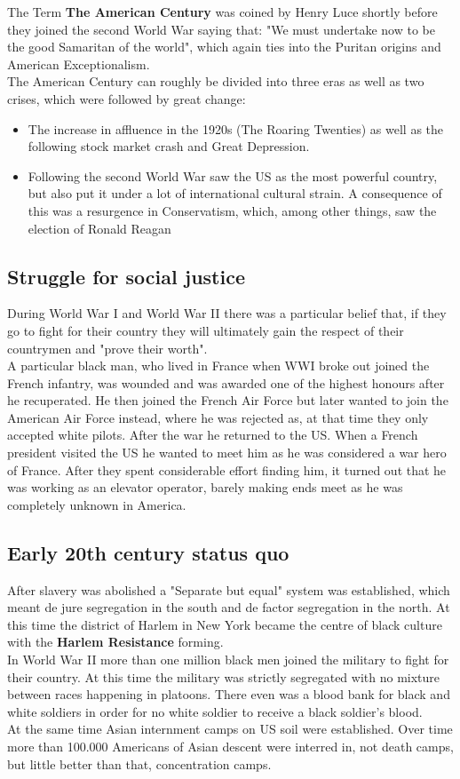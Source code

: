 \documentclass{article}
\begin{document}
	The Term \textbf{The American Century} was coined by Henry Luce shortly before they joined the second World War saying that: "We must undertake now to be the good Samaritan of the world", which again ties into the Puritan origins and American Exceptionalism. \\
	The American Century can roughly be divided into three eras as well as two crises, which were followed by great change:
	\begin{itemize}
		\item{The increase in affluence in the 1920s (The Roaring Twenties) as well as the following stock market crash and Great Depression.}
		\item{Following the second World War saw the US as the most powerful country, but also put it under a lot of international cultural strain. A consequence of this was a resurgence in Conservatism, which, among other things, saw the election of Ronald Reagan}
	\end{itemize}
	\subsection{Struggle for social justice}
	During World War I and World War II there was a particular belief that, if they go to fight for their country they will ultimately gain the respect of their countrymen and "prove their worth". \\
	A particular black man, who lived in France when WWI broke out joined the French infantry, was wounded and was awarded one of the highest honours after he recuperated. He then joined the French Air Force but later wanted to join the American Air Force instead, where he was rejected as, at that time they only accepted white pilots. After the war he returned to the US. When a French president visited the US he wanted to meet him as he was considered a war hero of France. After they spent considerable effort finding him, it turned out that he was working as an elevator operator, barely making ends meet as he was completely unknown in America. \\
	\subsection{Early 20th century status quo}
	After slavery was abolished a "Separate but equal" system was established, which meant de jure segregation in the south and de factor segregation in the north. At this time the district of Harlem in New York became the centre of black culture with the \textbf{Harlem Resistance} forming. \\
	In World War II more than one million black men joined the military to fight for their country. At this time the military was strictly segregated with no mixture between races happening in platoons. There even was a blood bank for black and white soldiers in order for no white soldier to receive a black soldier's blood. \\
	At the same time Asian internment camps on US soil were established. Over time more than 100.000 Americans of Asian descent were interred in, not death camps, but little better than that, concentration camps. \\
\end{document}
